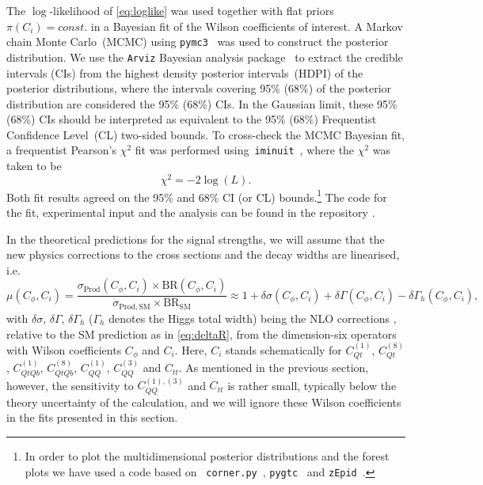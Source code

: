The $\log$-likelihood of \eqref{eq:loglike} was used together with flat priors~$ \pi(C_i)= const.$ in a Bayesian fit of the Wilson coefficients of interest.  A Markov chain Monte Carlo~(MCMC) using \texttt{pymc3}~\cite{Salvatier2016} was used to construct the posterior distribution. We use the \texttt{Arviz} Bayesian analysis package~\cite{arviz_2019} to extract the credible intervals (CIs) from the highest density posterior intervals~(HDPI) of the posterior distributions, where the intervals covering 95\% (68\%) of the posterior distribution are considered the 95\% (68\%) CIs. In the Gaussian limit, these  95\% (68\%) CIs should be interpreted as equivalent to the 95\%  (68\%) Frequentist  Confidence Level~(CL) two-sided bounds. To cross-check the MCMC Bayesian fit, a frequentist Pearson's $\chi^2$ fit was performed using~\texttt{iminuit}~\cite{James:1975dr,iminuit}, where the $\chi^2$ was taken to be 
\begin{equation}
	\chi^2 = - 2 \log(L).
\end{equation}
%
Both fit results agreed on the 95\%  and 68\% CI (or CL)  bounds.\footnote{In order to plot the multidimensional posterior distributions and the forest plots we have used a code based on ~\texttt{corner.py}~\cite{corner}, \texttt{pygtc}~\cite{Bocquet2016} and \texttt{zEpid}~\cite{paul_zivich_2019_3339870}.}
The code for the fit, experimental input and the analysis can be found in the repository \cite{GitHub}.
\par
In the theoretical predictions for the signal strengths, we will assume that the new physics corrections to the cross sections and the decay widths are linearised, i.e.
%
\begin{equation}
	\mu(C_\phi,C_i)=\frac{\sigma_\mathrm{ Prod}(C_\phi,C_i) \times \mathrm{ BR}(C_\phi,C_i)}{\sigma_\mathrm{ Prod, SM}\times \mathrm{BR}_\mathrm{ SM}} \approx 1+\delta \sigma(C_\phi,C_i)+\delta\Gamma(C_\phi,C_i)-\delta \Gamma_h(C_\phi,C_i),
	\label{linear-mu}
\end{equation}
%
with $\delta \sigma$, $\delta \Gamma$, $\delta \Gamma_h$ ($\Gamma_h$ denotes the Higgs total width) being the NLO corrections%
, relative to the SM prediction as in \eqref{eq:deltaR}, 
from the dimension-six operators with Wilson coefficients $C_\phi$ and $C_i$. Here, $C_i$ stands schematically for $C_{Qt}^{(1)}$, $C_{Qt}^{(8)}$, $C_{QtQb}^{(1)}$, $C_{QtQb}^{(8)}$, $C_{QQ}^{(1)}$, $C_{QQ}^{(3)}$ and $C_{tt}$.  As mentioned in the previous section, however, the sensitivity to $C_{QQ}^{(1),(3)}$ and $C_{tt}$ is rather small, typically below the theory uncertainty of the calculation, and we will ignore these Wilson coefficients in the fits presented in this section. 

